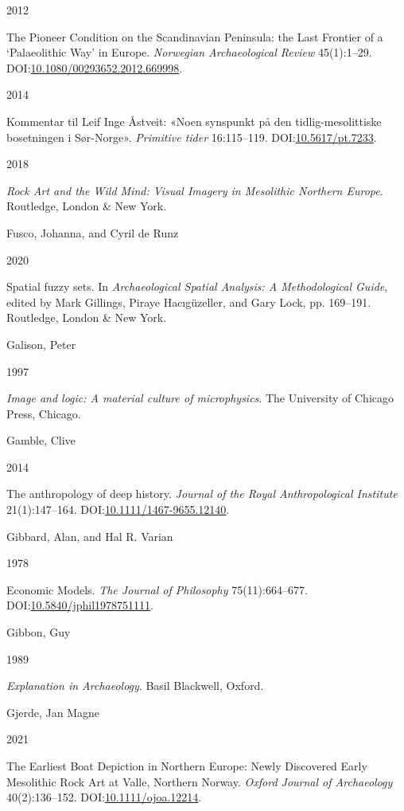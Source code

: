 \documentclass[
  12pt,
  a4paper,
  oneside]{book}
\newlength{\cslhangindent}
\newlength{\csllabelwidth}
\newlength{\cslentryspacingunit} %
\newenvironment{CSLReferences}[2] %
 {%
  \setlength{\parindent}{0pt}
  \ifodd #1
  \let\oldpar\par
  \def\par{\hangindent=\cslhangindent\oldpar}
  \fi
  \setlength{\parskip}{#2\cslentryspacingunit}
 }%
 {}
\newcommand{\CSLBlock}[1]{#1\hfill\break}
\newcommand{\CSLLeftMargin}[1]{\parbox[t]{\csllabelwidth}{#1}}
\newcommand{\CSLRightInline}[1]{\parbox[t]{\linewidth - \csllabelwidth}{#1}\break}
\begin{document}
\begin{CSLReferences}{0}{0}
\leavevmode{}%
\CSLLeftMargin{ 2012 }
\CSLRightInline{{The Pioneer Condition on the Scandinavian Peninsula: the Last Frontier of a {`}Palaeolithic Way{'} in Europe}. \emph{Norwegian Archaeological Review} 45(1):1--29. DOI:\href{https://doi.org/10.1080/00293652.2012.669998}{10.1080/00293652.2012.669998}.}

\leavevmode{}%
\CSLLeftMargin{ 2014 }
\CSLRightInline{{Kommentar til Leif Inge Åstveit: «Noen synspunkt på den tidlig-mesolittiske bosetningen i Sør-Norge»}. \emph{Primitive tider} 16:115--119. DOI:\href{https://doi.org/10.5617/pt.7233}{10.5617/pt.7233}.}

\leavevmode{}%
\CSLLeftMargin{ 2018 }
\CSLRightInline{\emph{{Rock Art and the Wild Mind: Visual Imagery in Mesolithic Northern Europe}}. Routledge, London \& New York.}

\leavevmode{}%
\CSLBlock{Fusco, Johanna, and Cyril de Runz}
\CSLLeftMargin{ 2020}
\CSLRightInline{Spatial fuzzy sets. In \emph{{Archaeological Spatial Analysis: A Methodological Guide}}, edited by Mark Gillings, Piraye Hacıgüzeller, and Gary Lock, pp. 169--191. Routledge, London \& New York.}

\leavevmode{}%
\CSLBlock{Galison, Peter}
\CSLLeftMargin{ 1997}
\CSLRightInline{\emph{{Image and logic: A material culture of microphysics}}. The University of Chicago Press, Chicago.}

\leavevmode{}%
\CSLBlock{Gamble, Clive}
\CSLLeftMargin{ 2014}
\CSLRightInline{{The anthropology of deep history}. \emph{Journal of the Royal Anthropological Institute} 21(1):147--164. DOI:\href{https://doi.org/10.1111/1467-9655.12140}{10.1111/1467-9655.12140}.}

\leavevmode{}%
\CSLBlock{Gibbard, Alan, and Hal R. Varian}
\CSLLeftMargin{ 1978}
\CSLRightInline{{Economic Models}. \emph{The Journal of Philosophy} 75(11):664--677. DOI:\href{https://doi.org/10.5840/jphil1978751111}{10.5840/jphil1978751111}.}

\leavevmode{}%
\CSLBlock{Gibbon, Guy}
\CSLLeftMargin{ 1989}
\CSLRightInline{\emph{{Explanation in Archaeology}}. Basil Blackwell, Oxford.}

\leavevmode{}%
\CSLBlock{Gjerde, Jan Magne}
\CSLLeftMargin{ 2021}
\CSLRightInline{{The Earliest Boat Depiction in Northern Europe: Newly Discovered Early Mesolithic Rock Art at Valle, Northern Norway}. \emph{Oxford Journal of Archaeology} 40(2):136--152. DOI:\href{https://doi.org/10.1111/ojoa.12214}{10.1111/ojoa.12214}.}


\end{CSLReferences}
\end{document}
